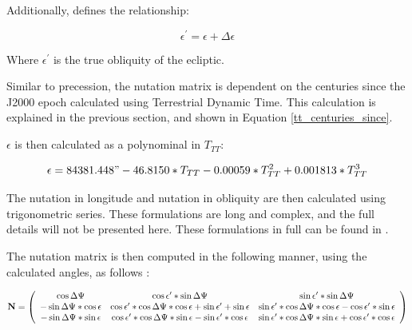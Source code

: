 Additionally, \cite{Bond1} defines the relationship:

\begin{equation}\label{true_obliquity}
\epsilon^{\prime} = \epsilon + \Delta\epsilon
\end{equation}

Where $\epsilon^{\prime}$ is the true obliquity of the ecliptic.

Similar to precession, the nutation matrix is dependent on the centuries
since the J2000 epoch calculated using Terrestrial Dynamic Time. This
calculation is explained in the previous section, and shown in Equation 
\ref{tt_centuries_since}.

$\epsilon$ is then calculated as a polynominal in $T_{TT}$:

\begin{equation} \label{mean_obliquity_formula}
\epsilon = 84381.448"  - 46.8150 * T_{TT} - 0.00059 * T^2_{TT} + 0.001813 * T^3_{TT}
\end{equation}

The nutation in longitude and nutation in obliquity are then calculated using
trigonometric series. These formulations are long and complex, and the full
details will not be presented here. These formulations in full can be found
in \cite{Bond1}.

The nutation matrix is then computed in the following manner, using the
calculated angles, as follows \cite{Bond1}:

\begin{equation}\label{nutation_matrix}
{\bf N} =
\left( \begin{array} {ccc}

\cos \Delta\Psi
& \cos \epsilon^{\prime} * \sin \Delta\Psi
& \sin \epsilon^{\prime} * \sin \Delta\Psi \\

-\sin \Delta\Psi * \cos \epsilon
& \cos \epsilon^{\prime} * \cos \Delta\Psi * \cos \epsilon + \sin \epsilon^{\prime} + \sin \epsilon
& \sin \epsilon^{\prime} * \cos \Delta\Psi * \cos \epsilon - \cos \epsilon^{\prime}* \sin \epsilon \\

-\sin \Delta\Psi * \sin \epsilon
& \cos \epsilon^{\prime} * \cos \Delta\Psi * \sin \epsilon - \sin \epsilon^{\prime} * \cos \epsilon
& \sin \epsilon^{\prime} * \cos \Delta\Psi * \sin \epsilon + \cos \epsilon^{\prime} * \cos \epsilon

\end{array} \right)
\end{equation}

